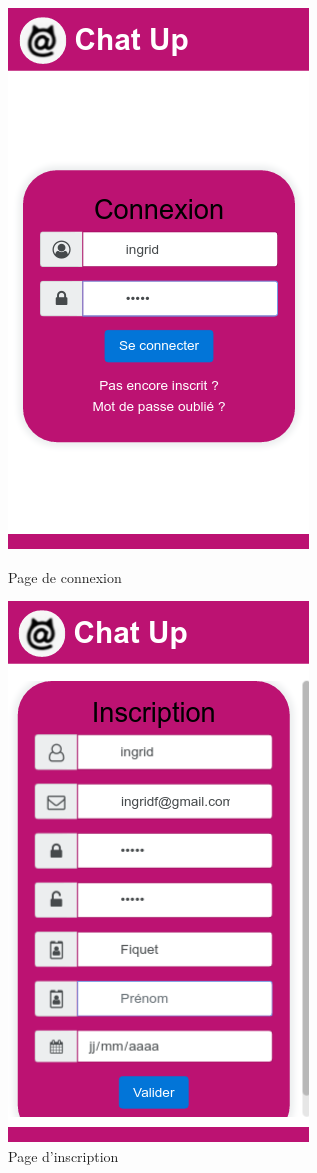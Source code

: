 \begin{figure}[H]
   \begin{minipage}[c]{.46\linewidth}
      \includegraphics[scale=0.5]{img/01Login.png}
      \caption{Page de connexion}
   \end{minipage} \hfill
   \begin{minipage}[c]{.46\linewidth}
      \includegraphics[scale=0.5]{img/02InscriptionChamp.png}
      \caption{Page d'inscription}
   \end{minipage}
\end{figure}


